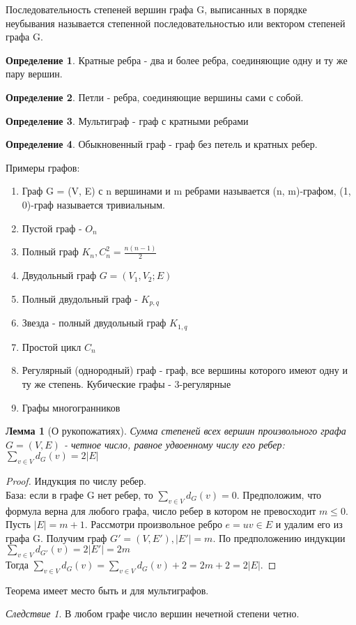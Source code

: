 \documentclass[a4paper]{article}
\newtheorem{lemma}{Лемма}[section]
\theoremstyle{definition}
\newtheorem*{definition}{Определение}
\theoremstyle{remark}
\newtheorem*{corollary}{Следствие}
\begin{document}
    Последовательность степеней вершин графа G, выписанных в порядке неубывания называется степенной
    последовательностью или вектором степеней графа G.
    \begin{definition}
        Кратные ребра - два и более ребра, соединяющие одну и ту же пару вершин.
    \end{definition}
    \begin{definition}
        Петли - ребра, соединяющие вершины сами с собой.
    \end{definition}
    \begin{definition}
        Мультиграф - граф с кратными ребрами
    \end{definition}
    \begin{definition}
        Обыкновенный граф - граф без петель и кратных ребер.
    \end{definition}
    Примеры графов:
    \begin{enumerate}
        \item Граф G = (V, E) с n вершинами и m ребрами называется (n, m)-графом,
        (1, 0)-граф называется тривиальным.
        \item Пустой граф - $O_n$
        \item Полный граф $K_n, C_n^2 = \frac{n(n-1)}{2}$
        \item Двудольный граф $G = (V_1, V_2; E)$
        \item Полный двудольный граф - $K_{p,q}$
        \item Звезда - полный двудольный граф $K_{1,q}$
        \item Простой цикл $C_n$
        \item Регулярный (однородный) граф - граф, все вершины которого имеют
        одну и ту же степень. 
        Кубические графы - 3-регулярные
        \item Графы многогранников 
    \end{enumerate}
    \begin{lemma}[О рукопожатиях]
        Сумма степеней всех вершин произвольного графа $G = (V, E)$ - четное число, равное удвоенному
        числу его ребер:
        $\sum_{v\in V} d_G(v) = 2|E|$
    \end{lemma}
    \begin{proof}
        Индукция по числу ребер.\\
        База: если в графе G нет ребер, то $\sum_{v\in V} d_G(v) = 0$.
        Предположим, что формула верна для любого графа, число ребер в котором не превосходит $m\leq 0$.\\
        Пусть $|E| = m+1$. Рассмотри произвольное ребро $e = uv\in E$ и удалим его из графа G. Получим граф
        $G' = (V, E'), |E'| = m$. По предположению индукции $\sum_{v\in V} d_{G'}(v) = 2 |E'| = 2m$\\
        Тогда $\sum_{v\in V} d_{G}(v) = \sum_{v\in V} d_G(v) + 2 = 2m + 2 = 2|E|$.
    \end{proof}
    Теорема имеет место быть и для мультиграфов.
    \begin{corollary}
        В любом графе число вершин нечетной степени четно.
    \end{corollary}
\end{document}
